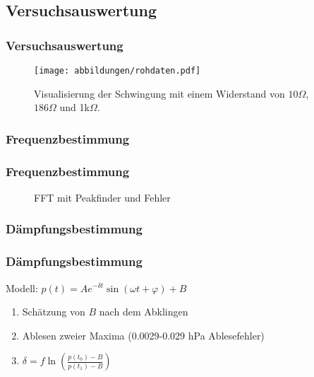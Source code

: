 \documentclass{beamer}
\begin{document}
\subsection{Versuchsauswertung}

\begin{frame}
\frametitle{Versuchsauswertung}
\begin{figure}
\texttt{[image: abbildungen/rohdaten.pdf]}
\caption{Visualisierung der Schwingung mit einem Widerstand von $10\Omega$, $186\Omega$ und 1k$\Omega$.}
\end{figure}
\end{frame}

\subsubsection{Frequenzbestimmung}

\begin{frame}
\frametitle{Frequenzbestimmung}

\begin{figure}
\centering
\caption{FFT mit Peakfinder und Fehler}
\end{figure}

\end{frame}

\subsubsection{Dämpfungsbestimmung}

\begin{frame}
\frametitle{Dämpfungsbestimmung}

Modell: \hspace{0.2cm} $p(t) = Ae^{-\delta t} \sin(\omega t + \varphi) + B$

\begin{enumerate}[-]
\item Schätzung von $B$ nach dem Abklingen
\item Ablesen zweier Maxima (0.0029-0.029 hPa Ablesefehler)
\item $\delta = f\ln\left( \frac{p(t_0)-B}{p(t_1)-B} \right)$
\end{enumerate}

\begin{figure}
\centering
\end{figure}

\end{frame}
\end{document}
